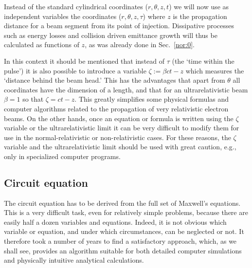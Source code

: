\documentclass [12pt,a4paper,     ]{report} %
\newcommand{\DEF}{:=}                 %
\begin{document}
    Instead of the standard cylindrical coordinates ($r,\theta, z, t$) we will now use as independent variables the coordinates ($r,\theta, z, \tau$) where $z$ is the propagation distance for a beam segment from its point of injection.  Dissipative processes such as energy losses and collision driven emittance growth will thus be calculated as functions of $z$, as was already done in Sec.~\ref{nor:0}.

   In this context it should be mentioned that instead of $\tau$ (the `time within the pulse') it is also possible to introduce a variable $\zeta \DEF \beta c t - z$ which measures the `distance behind the beam head.'  This has the advantages that apart from $\theta$ all coordinates have the dimension of a length, and that for an ultrarelativistic beam $\beta=1$ so that $\zeta = c t - z$.  This greatly simplifies some physical formulas and computer algorithms related to the propagation of very relativistic electron beams.  On the other hands, once an equation or formula is written using the $\zeta$ variable or the ultrarelativistic limit it can be very difficult to modify them for use in the normal-relativistic or non-relativistic cases.  For these reasons, the $\zeta$ variable and the ultrarelativistic limit should be used with great caution, e.g., only in specialized computer programs.
  

\subsection{Circuit equation}

	The circuit equation has to be derived from the full set of Maxwell's equations.  This is a very difficult task, even for relatively simple problems, because there are easily half a dozen variables and equations.  Indeed, it is not obvious which variable or equation, and under which circumstances, can be neglected or not.  It therefore took a number of years to find a satisfactory approach, which, as we shall see, provides an algorithm suitable for both detailed computer simulations and physically intuitive analytical calculations.
\end{document}
